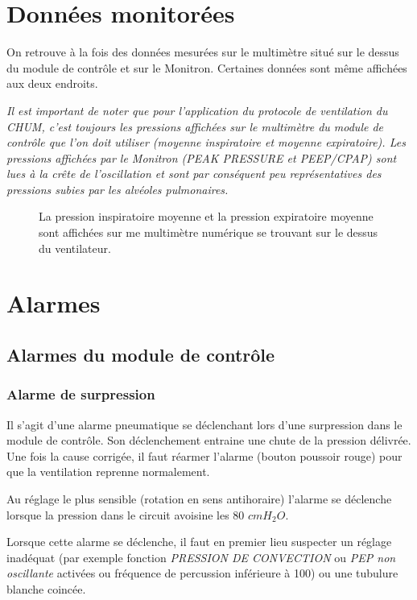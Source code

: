 \documentclass[letterpaper, titlepage]{article}
\begin{document}
\section{Données monitorées}

On retrouve à la fois des données mesurées sur le multimètre situé sur
le dessus du module de contrôle et sur le Monitron. Certaines données
sont même affichées aux deux endroits.

\emph{Il est important de noter que pour l'application du protocole de
ventilation du CHUM, c'est toujours les pressions affichées sur le
multimètre du module de contrôle que l'on doit utiliser (moyenne
inspiratoire et moyenne expiratoire).  Les pressions affichées par le Monitron (PEAK PRESSURE et PEEP/CPAP)
sont lues à la crête de l'oscillation et sont par conséquent peu
représentatives des pressions subies par les alvéoles pulmonaires.
}


\begin{figure}
	
	\caption{La pression inspiratoire moyenne et la pression expiratoire moyenne sont affichées sur me multimètre numérique se trouvant sur le dessus du ventilateur.}
\end{figure}

\section{Alarmes}

\subsection{Alarmes du module de contrôle}

\subsubsection*{Alarme de surpression}

Il s'agit d'une alarme pneumatique se déclenchant lors d'une surpression
dans le module de contrôle. Son déclenchement entraine une chute de la
pression délivrée. Une fois la cause corrigée, il faut réarmer l'alarme
(bouton poussoir rouge) pour que la ventilation reprenne normalement.

Au réglage le plus sensible (rotation en sens antihoraire) l'alarme se
déclenche lorsque la pression dans le circuit avoisine les 80 $cmH_2O$.

Lorsque cette alarme se déclenche, il faut en premier lieu suspecter un
réglage inadéquat (par exemple fonction \emph{PRESSION DE CONVECTION} ou
\emph{PEP non oscillante} activées ou fréquence de percussion inférieure
à 100) ou une tubulure blanche coincée.
\end{document}
